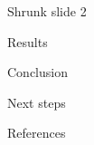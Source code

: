 \documentclass[english]{beamer}\usepackage[]{graphicx}\usepackage[]{xcolor}
\begin{document}
\begin{frame}[shrink = 23]{Shrunk slide 2}


\end{frame}



\begin{frame}{Results}


\end{frame}

\begin{frame}{Conclusion}


\end{frame}


\begin{frame}{Next steps}


\end{frame}

\begin{frame}{References}
  \small
  

\end{frame}


\end{document}
